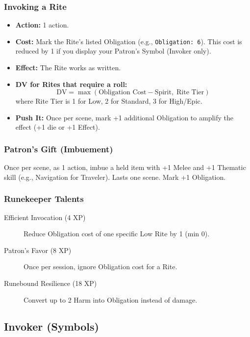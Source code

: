 \subsubsection*{Invoking a Rite}
\label{sec:invoking-rite}
\begin{itemize}
  \item \textbf{Action:} 1 action.
  \item \textbf{Cost:} Mark the Rite's listed Obligation (e.g., \texttt{Obligation: 6}). This cost is reduced by 1 if you display your Patron's Symbol (Invoker only).
  \item \textbf{Effect:} The Rite works as written.
  \item \textbf{DV for Rites that require a roll:} 
  \[
  \text{DV} = \max(\text{Obligation Cost} - \text{Spirit},\; \text{Rite Tier})
  \]
  where Rite Tier is 1 for Low, 2 for Standard, 3 for High/Epic.
  \item \textbf{Push It:} Once per scene, mark +1 additional Obligation to amplify the effect (+1 die or +1 Effect).
\end{itemize}

\subsubsection*{Patron's Gift (Imbuement)}
\label{sec:patrons-gift}
Once per scene, as 1 action, imbue a held item with +1 Melee and +1 Thematic skill (e.g., Navigation for Traveler). Lasts one scene. Mark +1 Obligation.

\subsubsection*{Runekeeper Talents}
\label{sec:runekeeper-talents}
\begin{description}
  \item[Efficient Invocation (4 XP)] Reduce Obligation cost of one specific Low Rite by 1 (min 0).
  \item[Patron's Favor (8 XP)] Once per session, ignore Obligation cost for a Rite.
  \item[Runebound Resilience (18 XP)] Convert up to 2 Harm into Obligation instead of damage.
\end{description}

\subsection{Invoker (Symbols)}
\label{sec:invoker}

